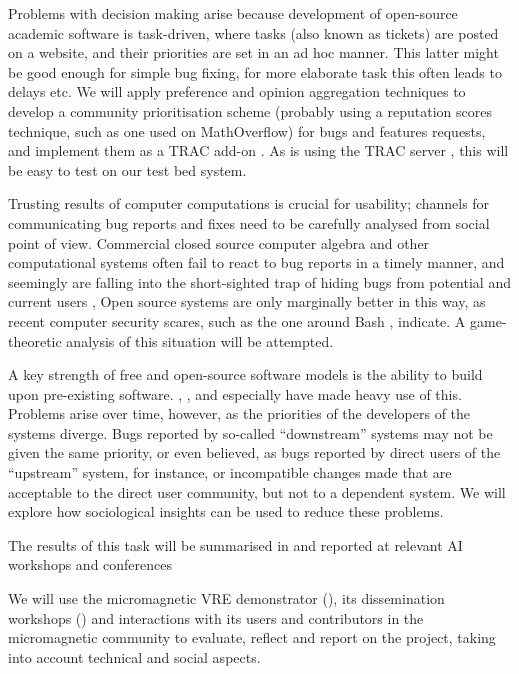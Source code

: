 \begin{workpackage}[id=social-aspects,wphases=0-48,
  title=Social Aspects,
  lead=UO,
  UORM=23,USHRM=18,USORM=6]
\begin{tasklist}
\begin{task}[title=Mechanism Design for free software development,PM=15,lead=UO,
id=isocial-decisionmaking]
Problems with decision making arise because 
development of open-source academic software is task-driven,
where tasks (also known as tickets) are posted on a website, and their
priorities are set in an ad hoc manner.  This latter might be
good enough for simple bug fixing, for more elaborate task this often
leads to delays etc.  
We will apply preference
and opinion aggregation techniques \cite{pref-aggr} to develop a
community prioritisation scheme (probably using a reputation scores
technique, such as one used on MathOverflow) for bugs and features requests,
and implement them as a TRAC \cite{Trac} add-on 
.
As \Sage is using the TRAC server \cite{trac-sagemath}, 
this will be easy to test on our test bed system.

 Trusting results of computer computations is crucial for
usability; channels for communicating bug reports and fixes need to be
carefully analysed from social point of view.  Commercial closed
source computer algebra and other computational systems often fail to
react to bug reports in a timely manner, and seemingly are falling
into the short-sighted trap of hiding bugs from potential and current
users \cite{misfort}, Open source systems are only marginally better
in this way, as recent computer security scares, such as the one
around Bash \cite{shellshock}, indicate.  A game-theoretic analysis of
this situation will be attempted.


A key strength of free and open-source software models is the ability
to build upon pre-existing software. \GAP, \PariGP, \Singular and
especially \Sage have made heavy use of this. Problems arise over
time, however, as the priorities of the developers of the systems
diverge. Bugs reported by so-called ``downstream'' systems may not be
given the same priority, or even believed, as bugs reported by direct
users of the ``upstream'' system, for instance, or incompatible
changes made that are acceptable to the direct user community, but not
to a dependent system. We will explore how sociological insights can
be used to reduce these problems.

The results of this task will be summarised in 
and reported at relevant AI workshops and conferences
\end{task}

\begin{task}[title=Evaluation of Micromagnetic VRE,lead=USO,PM=6,
id=oommf-nb-evaluation,partners={UO,PS},wphases=28-40!0.5]
  We will use the micromagnetic VRE demonstrator
  (), its dissemination
  workshops \linebreak()
  and interactions with its users and contributors in the
  micromagnetic community to evaluate, reflect and report on the project,
  taking into account technical and social aspects.


\end{task}
\end{tasklist}
\end{workpackage}
